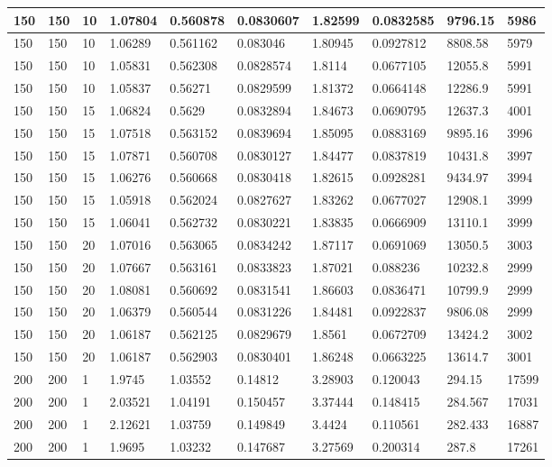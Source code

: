 \begin{landscape}
\begin{longtable}{ | l | l | l | l | l | l | l | l | l | l | }
150 & 150 & 10 & 1.07804 & 0.560878 & 0.0830607 & 1.82599 & 0.0832585 & 9796.15 & 5986\\ \hline
150 & 150 & 10 & 1.06289 & 0.561162 & 0.083046 & 1.80945 & 0.0927812 & 8808.58 & 5979\\ \hline
150 & 150 & 10 & 1.05831 & 0.562308 & 0.0828574 & 1.8114 & 0.0677105 & 12055.8 & 5991\\ \hline
150 & 150 & 10 & 1.05837 & 0.56271 & 0.0829599 & 1.81372 & 0.0664148 & 12286.9 & 5991\\ \hline
150 & 150 & 15 & 1.06824 & 0.5629 & 0.0832894 & 1.84673 & 0.0690795 & 12637.3 & 4001\\ \hline
150 & 150 & 15 & 1.07518 & 0.563152 & 0.0839694 & 1.85095 & 0.0883169 & 9895.16 & 3996\\ \hline
150 & 150 & 15 & 1.07871 & 0.560708 & 0.0830127 & 1.84477 & 0.0837819 & 10431.8 & 3997\\ \hline
150 & 150 & 15 & 1.06276 & 0.560668 & 0.0830418 & 1.82615 & 0.0928281 & 9434.97 & 3994\\ \hline
150 & 150 & 15 & 1.05918 & 0.562024 & 0.0827627 & 1.83262 & 0.0677027 & 12908.1 & 3999\\ \hline
150 & 150 & 15 & 1.06041 & 0.562732 & 0.0830221 & 1.83835 & 0.0666909 & 13110.1 & 3999\\ \hline
150 & 150 & 20 & 1.07016 & 0.563065 & 0.0834242 & 1.87117 & 0.0691069 & 13050.5 & 3003\\ \hline
150 & 150 & 20 & 1.07667 & 0.563161 & 0.0833823 & 1.87021 & 0.088236 & 10232.8 & 2999\\ \hline
150 & 150 & 20 & 1.08081 & 0.560692 & 0.0831541 & 1.86603 & 0.0836471 & 10799.9 & 2999\\ \hline
150 & 150 & 20 & 1.06379 & 0.560544 & 0.0831226 & 1.84481 & 0.0922837 & 9806.08 & 2999\\ \hline
150 & 150 & 20 & 1.06187 & 0.562125 & 0.0829679 & 1.8561 & 0.0672709 & 13424.2 & 3002\\ \hline
150 & 150 & 20 & 1.06187 & 0.562903 & 0.0830401 & 1.86248 & 0.0663225 & 13614.7 & 3001\\ \hline
200 & 200 & 1 & 1.9745 & 1.03552 & 0.14812 & 3.28903 & 0.120043 & 294.15 & 17599\\ \hline
200 & 200 & 1 & 2.03521 & 1.04191 & 0.150457 & 3.37444 & 0.148415 & 284.567 & 17031\\ \hline
200 & 200 & 1 & 2.12621 & 1.03759 & 0.149849 & 3.4424 & 0.110561 & 282.433 & 16887\\ \hline
200 & 200 & 1 & 1.9695 & 1.03232 & 0.147687 & 3.27569 & 0.200314 & 287.8 & 17261\\ \hline

\end{longtable}
\end{landscape}
